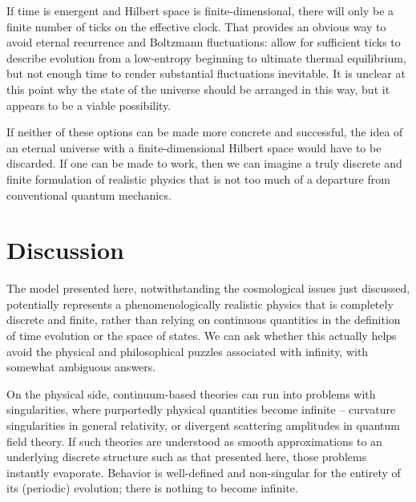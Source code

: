 \documentclass[aps,prd,twocolumn,nofootinbib,notitlepage]{revtex4-1}
\begin{document}
If time is emergent and Hilbert space is finite-dimensional, there will only be a finite number of ticks on the effective clock.
That provides an obvious way to avoid eternal recurrence and Boltzmann fluctuations: allow for sufficient ticks to describe evolution from a low-entropy beginning to ultimate thermal equilibrium, but not enough time to render substantial fluctuations inevitable.
It is unclear at this point why the state of the universe should be arranged in this way, but it appears to be a viable possibility.

If neither of these options can be made more concrete and successful, the idea of an eternal universe with a finite-dimensional Hilbert space would have to be discarded.
If one can be made to work, then we can imagine a truly discrete and finite formulation of realistic physics that is not too much of a departure from conventional quantum mechanics.

\section{Discussion}

The model presented here, notwithstanding the cosmological issues just discussed, potentially represents a phenomenologically realistic physics that is completely discrete and finite, rather than relying on continuous quantities in the definition of time evolution or the space of states.
We can ask whether this actually helps avoid the physical and philosophical puzzles associated with infinity, with somewhat ambiguous answers.

On the physical side, continuum-based theories can run into problems with singularities, where purportedly physical quantities become infinite -- curvature singularities in general relativity, or divergent scattering amplitudes in quantum field theory.
If such theories are understood as smooth approximations to an underlying discrete structure such as that presented here, those problems instantly evaporate.
Behavior is well-defined and non-singular for the entirety of its (periodic) evolution; there is nothing to become infinite.
\end{document}
